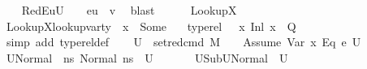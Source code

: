 \begin{isabellebody}
\ \ \isamarkupfalse%
\ RedE{}{\isacharcolon}{\kern0pt}{\isachardoublequoteopen}{\isasymforall}u{\isasymin}U{}{\isachardot}{\kern0pt}\ \ {\isasymLambda}{\isacharprime}{\kern0pt}{\isacharcomma}{\kern0pt}{\isasymGamma}{\isacharcomma}{\kern0pt}{\isasymOmega}\ {\isasymturnstile}\ {\isasymlangle}e{}{\isacharcomma}{\kern0pt}u{\isasymrangle}\ {\isasymDown}\ v{}{\isachardoublequoteclose}\ \isamarkupfalse%
\ blast\ \ \isanewline
\ \ \isamarkupfalse%
\ LookupX{}\ \isamarkupfalse%
\ LookupX{}{\isacharcolon}{\kern0pt}{\isachardoublequoteopen}lookup{\isacharunderscore}{\kern0pt}var{\isacharunderscore}{\kern0pt}ty\ {\isasymLambda}{\isacharprime}{\kern0pt}\ x{}\ {\isacharequal}{\kern0pt}\ Some\ {\isasymtau}{\isachardoublequoteclose}\ \isamarkupfalse%
\ {\isacartoucheopen}type{\isacharunderscore}{\kern0pt}rel\ {\isasymLambda}\ {\isasymLambda}{\isacharprime}{\kern0pt}\ {\isacharparenleft}{\kern0pt}{\isacharparenleft}{\kern0pt}x{}{\isacharcomma}{\kern0pt}\ {\isacharparenleft}{\kern0pt}Inl\ x{}{\isacharparenright}{\kern0pt}{\isacharparenright}{\kern0pt}\ {\isacharhash}{\kern0pt}\ Q{\isacharparenright}{\kern0pt}{\isacartoucheclose}\ \isamarkupfalse%
\ {\isacharparenleft}{\kern0pt}simp\ add{\isacharcolon}{\kern0pt}\ type{\isacharunderscore}{\kern0pt}rel{\isacharunderscore}{\kern0pt}def{\isacharparenright}{\kern0pt}\isanewline
\ \ \isamarkupfalse%
\ {\isacharquery}{\kern0pt}U{}\ {\isacharequal}{\kern0pt}\ {\isachardoublequoteopen}{\isacharparenleft}{\kern0pt}set{\isacharunderscore}{\kern0pt}red{\isacharunderscore}{\kern0pt}cmd\ M\ {\isasymLambda}{\isacharprime}{\kern0pt}\ {\isasymGamma}\ {\isasymOmega}\ {\isacharparenleft}{\kern0pt}Assume\ {\isacharparenleft}{\kern0pt}{\isacharparenleft}{\kern0pt}Var\ x{}{\isacharparenright}{\kern0pt}\ {\isasymguillemotleft}Eq{\isasymguillemotright}\ e{}{\isacharparenright}{\kern0pt}{\isacharparenright}{\kern0pt}\ U{}{\isacharparenright}{\kern0pt}{\isachardoublequoteclose}\isanewline
\ \ \isamarkupfalse%
\ {\isacharquery}{\kern0pt}U{}Normal\ {\isacharequal}{\kern0pt}\ {\isachardoublequoteopen}{\isacharbraceleft}{\kern0pt}ns{\isachardot}{\kern0pt}\ Normal\ ns\ {\isasymin}\ {\isacharquery}{\kern0pt}U{}{\isacharbraceright}{\kern0pt}{\isachardoublequoteclose}\ \ \ \isanewline
\ \ \isamarkupfalse%
\ U{}Sub{\isacharcolon}{\kern0pt}{\isachardoublequoteopen}{\isacharquery}{\kern0pt}U{}Normal\ {\isasymsubseteq}\ U{}{\isachardoublequoteclose}\isanewline

\end{isabellebody}
